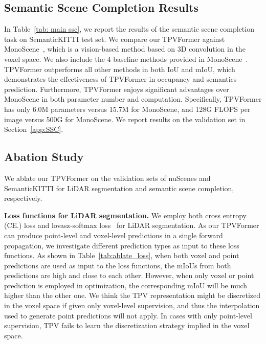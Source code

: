 \documentclass[10pt,twocolumn,letterpaper]{article}
\begin{document}
\subsection{Semantic Scene Completion Results}
In Table~\ref{tab: main ssc}, we report the results of the semantic scene completion task on SemanticKITTI test set.
We compare our TPVFormer against MonoScene~\cite{monoscene}, which is a vision-based method based on 3D convolution in the voxel space.
We also include the 4 baseline methods provided in MonoScene~\cite{monoscene}.
TPVFormer outperforms all other methods in both IoU and mIoU, which demonstrates the effectiveness of TPVFormer in occupancy and semantics prediction.
Furthermore, TPVFormer enjoys significant advantages over MonoScene in both parameter number and computation.
Specifically, TPVFormer has only 6.0M parameters versus 15.7M for MonoScene, and 128G FLOPS per image versus 500G for MonoScene.
We report results on the validation set in Section~\ref{app:SSC}.



\subsection{Abation Study}
We ablate our TPVFormer on the validation sets of nuScenes and SemanticKITTI for LiDAR segmentation and semantic scene completion, respectively.

\textbf{Loss functions for LiDAR segmentation.}
We employ both cross entropy (CE.) loss and lovasz-softmax loss~\cite{lovasz} for LiDAR segmentation.
As our TPVFormer can produce point-level and voxel-level predictions in a single forward propagation, we investigate different prediction types as input to these loss functions.
As shown in Table~\ref{tab:ablate_loss}, when both voxel and point predictions are used as input to the loss functions, the mIoUs from both predictions are high and close to each other.
However, when only voxel or point prediction is employed in optimization, the corresponding mIoU will be much higher than the other one.
We think the TPV representation might be discretized in the voxel space if given only voxel-level supervision, and thus the interpolation used to generate point predictions will not apply.
In cases with only point-level supervision, TPV fails to learn the discretization strategy implied in the voxel space.
\end{document}
